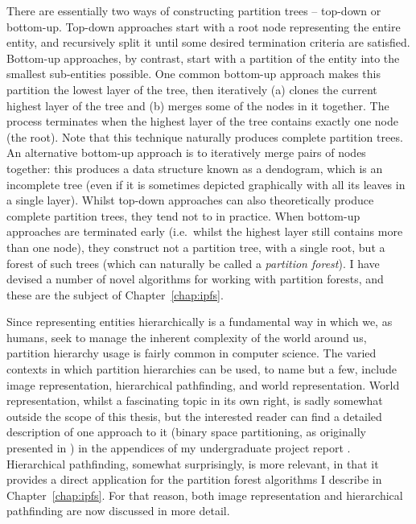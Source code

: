 There are essentially two ways of constructing partition trees -- top-down or bottom-up. Top-down approaches start with a root node representing the entire entity, and recursively split it until some desired termination criteria are satisfied. Bottom-up approaches, by contrast, start with a partition of the entity into the smallest sub-entities possible. One common bottom-up approach makes this partition the lowest layer of the tree, then iteratively (a) clones the current highest layer of the tree and (b) merges some of the nodes in it together. The process terminates when the highest layer of the tree contains exactly one node (the root). Note that this technique naturally produces complete partition trees. An alternative bottom-up approach is to iteratively merge pairs of nodes together: this produces a data structure known as a dendogram, which is an incomplete tree (even if it is sometimes depicted graphically with all its leaves in a single layer). Whilst top-down approaches can also theoretically produce complete partition trees, they tend not to in practice. When bottom-up approaches are terminated early (i.e.~whilst the highest layer still contains more than one node), they construct not a partition tree, with a single root, but a forest of such trees (which can naturally be called a \emph{partition forest}). I have devised a number of novel algorithms for working with partition forests, and these are the subject of Chapter~\ref{chap:ipfs}.

Since representing entities hierarchically is a fundamental way in which we, as humans, seek to manage the inherent complexity of the world around us, partition hierarchy usage is fairly common in computer science. The varied contexts in which partition hierarchies can be used, to name but a few, include image representation, hierarchical pathfinding, and world representation. World representation, whilst a fascinating topic in its own right, is sadly somewhat outside the scope of this thesis, but the interested reader can find a detailed description of one approach to it (binary space partitioning, as originally presented in \cite{fuchs80}) in the appendices of my undergraduate project report \cite{golodetz06}. Hierarchical pathfinding, somewhat surprisingly, is more relevant, in that it provides a direct application for the partition forest algorithms I describe in Chapter~\ref{chap:ipfs}. For that reason, both image representation and hierarchical pathfinding are now discussed in more detail.


